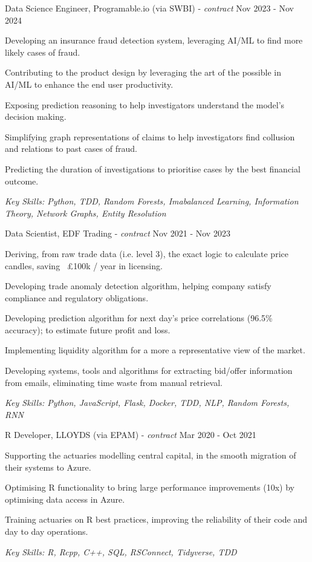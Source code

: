 \documentclass[11pt,article,oneside]{memoir}
\newenvironment{itemize*}{%
  \renewcommand\labelitemi{\textbullet}
  \footnotesize
  \begin{itemize}%
    \setlength{\itemsep}{0pt}}%
  {\end{itemize}
}
\begin{document}
\normalsize
\medskip
\ind Data Science Engineer, Programable.io (via SWBI) - \emph{contract} \hfill Nov 2023 - Nov 2024
\begin{itemize*}
    \item Developing an insurance fraud detection system, leveraging AI/ML to find more likely cases of fraud.
    \item Contributing to the product design by leveraging the art of the possible in AI/ML to enhance the end user productivity.
    \item Exposing prediction reasoning to help investigators understand the model's decision making.
    \item Simplifying graph representations of claims to help investigators find collusion and relations to past cases of fraud. 
    \item Predicting the duration of investigations to prioritise cases by the best financial outcome.
\end{itemize*}
\ind \hspace{0.35in} \footnotesize \emph{Key Skills: Python, TDD, Random Forests, Imabalanced Learning, Information Theory, Network Graphs, Entity Resolution}

\normalsize
\medskip
\ind Data Scientist, EDF Trading - \emph{contract} \hfill Nov 2021 - Nov 2023
\begin{itemize*}
    \item Deriving, from raw trade data (i.e. level 3), the exact logic to calculate price candles, saving ~£100k / year in licensing.
    \item Developing trade anomaly detection algorithm, helping company satisfy compliance and regulatory obligations.
    \item Developing prediction algorithm for next day's price correlations (96.5\% accuracy); to estimate future profit and loss. 
    \item Implementing liquidity algorithm for a more a representative view of the market.
    \item Developing systems, tools and algorithms for extracting bid/offer information from emails, eliminating time waste from manual retrieval. 
\end{itemize*}
\ind \hspace{0.35in} \footnotesize \emph{Key Skills: Python, JavaScript, Flask, Docker, TDD, NLP, Random Forests, RNN}

\normalsize
\medskip
\ind R Developer, LLOYDS (via EPAM) - \emph{contract} \hfill Mar 2020 - Oct 2021
\begin{itemize*}
    \item Supporting the actuaries modelling central capital, in the smooth migration of their systems to Azure.
    \item Optimising R functionality to bring large performance improvements (10x) by optimising data access in Azure. 
    \item Training actuaries on R best practices, improving the reliability of their code and day to day operations.
\end{itemize*}
\ind \hspace{0.35in} \footnotesize \emph{Key Skills: R, Rcpp, C++, SQL, RSConnect, Tidyverse, TDD}
\end{document}
